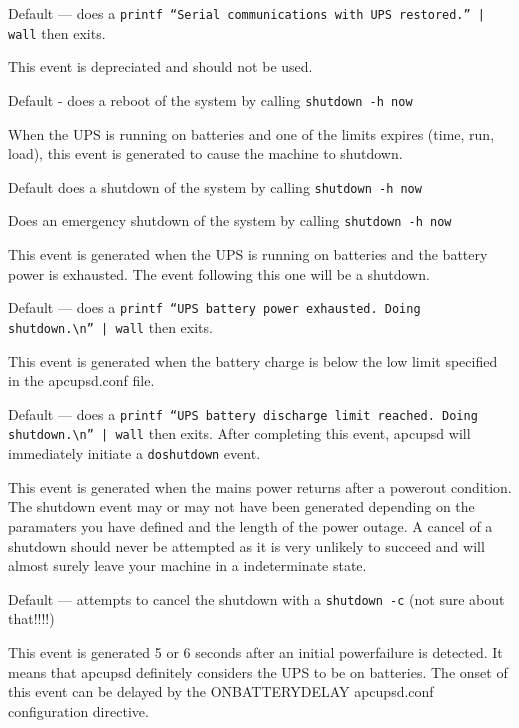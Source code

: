 {{{{{{{{{\begin{description}
Default {---} does a {\tt printf ``Serial communications with UPS restored.''
| wall} then exits.  

\item [doreboot]
   This event is depreciated and should not be used.  

Default - does a reboot of the system by calling {\tt shutdown -h now}  

\item [doshutdown]
   When the UPS is running on batteries and one of the limits expires (time, run,
load), this event is generated to cause the machine to shutdown.  

Default does a shutdown of the system by calling {\tt shutdown -h now}  

\item [emergency]
   Does an emergency shutdown of the system by calling {\tt shutdown -h now}  

\item [failing]
   This event is generated when the UPS is running on batteries and the battery
power is exhausted. The event following this one will be a shutdown.  

Default {---} does a {\tt printf ``UPS battery power exhausted. Doing
shutdown.\textbackslash{}n'' | wall} then exits.  

\item [loadlimit]
   This event is generated when the battery charge is below the low limit
specified in the apcupsd.conf file.  

Default {---} does a {\tt printf ``UPS battery discharge limit reached. Doing
shutdown.\textbackslash{}n'' | wall} then exits.  After completing this event,
apcupsd will immediately initiate a {\tt doshutdown} event.  

\item [mainsback]
   This event is generated when the mains power returns after a powerout
condition. The shutdown event may or may not have been generated depending on
the paramaters you have defined and the length of the power outage. A cancel
of a shutdown should never be attempted as it is very unlikely to succeed and
will almost surely leave your machine in a indeterminate state.  

Default {---} attempts to cancel the shutdown with a {\tt shutdown -c} (not
sure about that!!!!)  

\item [onbattery]
   This event is generated 5 or 6 seconds after an initial powerfailure is
detected. It means that apcupsd definitely considers the UPS to be on
batteries. The onset of this event can be delayed by the ONBATTERYDELAY
apcupsd.conf configuration directive.  


\end{description}}}}}}}}}}
